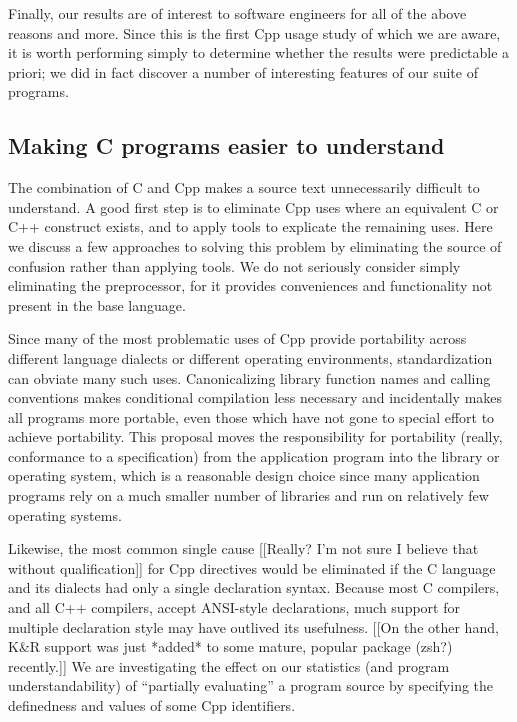 \documentclass[10pt]{article}
\begin{document}

Finally, our results are of interest to software engineers for all of the
above reasons and more.  Since this is the first Cpp usage study of which
we are aware, it is worth performing simply to determine whether the
results were predictable a priori; we did in fact discover a number of
interesting features of our suite of programs.


\subsection{Making C programs easier to understand}

The combination of C and Cpp makes a source text unnecessarily difficult to
understand.  A good first step is to eliminate Cpp uses where an equivalent
C or C++ construct exists, and to apply tools to explicate the remaining
uses.  Here we discuss a few approaches to solving this problem by
eliminating the source of confusion rather than applying tools.  We do not
seriously consider simply eliminating the preprocessor, for it provides
conveniences and functionality not present in the base language.

Since many of the most problematic uses of Cpp provide portability across
different language dialects or different operating environments,
standardization can obviate many such uses.  Canonicalizing library
function names and calling conventions makes conditional compilation less
necessary and incidentally makes all programs more portable, even those
which have not gone to special effort to achieve portability.  This
proposal moves the responsibility for portability (really, conformance to a
specification) from the application program into the library or operating
system, which is a reasonable design choice since many application programs
rely on a much smaller number of libraries and run on relatively few
operating systems.

Likewise, the most common single cause [[Really?  I'm not sure I believe
that without qualification]] for Cpp directives would be eliminated if the
C language and its dialects had only a single declaration syntax.  Because
most C compilers, and all C++ compilers, accept ANSI-style declarations,
much support for multiple declaration style may have outlived its
usefulness.  [[On the other hand, K\&R support was just *added* to some
mature, popular package (zsh?) recently.]]  We are investigating the effect
on our statistics (and program understandability) of ``partially
evaluating'' a program source by specifying the definedness and values of
some Cpp identifiers.
\end{document}
